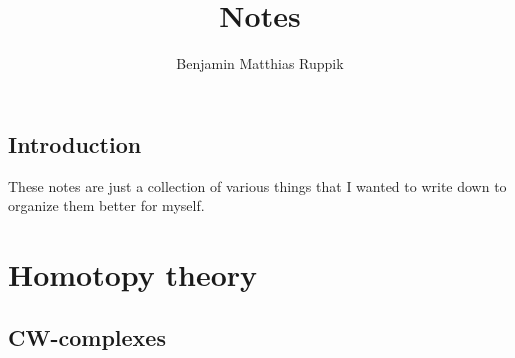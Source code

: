 \documentclass[nobib]{tufte-book} %
\title{Notes} %
\author{Benjamin Matthias Ruppik} %
\theoremstyle{definition}
\theoremstyle{remark}
\begin{document}
\frontmatter




\tableofcontents %







\section*{Introduction}

These notes are just a collection of various things
that I wanted to write down to organize them better for myself.


\mainmatter

\chapter{Homotopy theory}

\section{CW-complexes}
\end{document}
